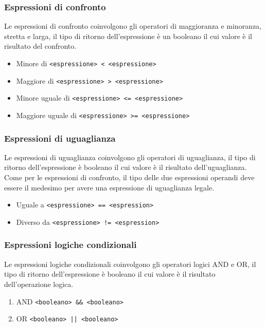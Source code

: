 \subsubsection{Espressioni di confronto}
Le espressioni di confronto coinvolgono gli operatori di maggioranza e minoranza, stretta e larga,
il tipo di ritorno dell'espressione è un booleano il cui valore è il risultato del confronto.
\begin{itemize}
    \item Minore di \lstinline|<espressione> < <espressione>|
    \item Maggiore di \lstinline|<espressione> > <espressione>|
    \item Minore uguale di \lstinline|<espressione> <= <espressione>|
    \item Maggiore uguale di \lstinline|<espressione> >= <espressione>|
\end{itemize}

\subsubsection{Espressioni di uguaglianza}
Le espressioni di uguaglianza coinvolgono gli operatori di uguaglianza, 
il tipo di ritorno dell'espressione è booleano il cui valore è il risultato dell'uguaglianza. 
\\
Come per le espressioni di confronto, il tipo delle due espressioni operandi deve essere il medesimo
per avere una espressione di uguaglianza legale.
\begin{itemize}
    \item Uguale a \lstinline|<espressione> == <espression>|
    \item Diverso da \lstinline|<espressione> != <espression>|
\end{itemize}

\subsubsection{Espressioni logiche condizionali}
Le espressioni logiche condizionali coinvolgono gli operatori logici AND e OR,
il tipo di ritorno dell'espressione è booleano il cui valore è il risultato dell'operazione logica.
\begin{enumerate}
    \item AND \lstinline|<booleano> && <booleano>|
    \item OR \lstinline=<booleano> || <booleano>=
\end{enumerate}

